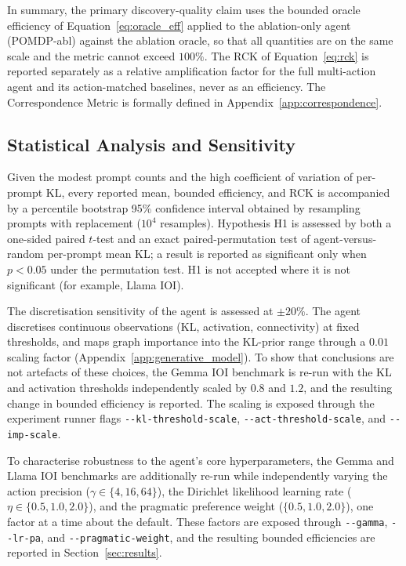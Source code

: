 In summary, the primary discovery-quality claim uses the bounded oracle
efficiency of Equation~\ref{eq:oracle_eff} applied to the ablation-only agent
(POMDP-abl) against the ablation oracle, so that all quantities are on the same
scale and the metric cannot exceed $100\%$. The RCK of Equation~\ref{eq:rck} is
reported separately as a relative amplification factor for the full
multi-action agent and its action-matched baselines, never as an efficiency.
The Correspondence Metric is formally defined in Appendix~\ref{app:correspondence}.

\subsection{Statistical Analysis and Sensitivity}
\label{sec:stats_protocol}

Given the modest prompt counts and the
high coefficient of variation of per-prompt KL, every reported mean,
bounded efficiency, and RCK is accompanied by a percentile bootstrap 95\% confidence
interval obtained by resampling prompts with replacement ($10^4$ resamples).
Hypothesis H1 is assessed by both a one-sided paired $t$-test and an exact
paired-permutation test of agent-versus-random per-prompt mean KL; a result is
reported as significant only when $p<0.05$ under the permutation test. H1 is not
accepted where it is not significant (for example, Llama IOI).

The discretisation sensitivity of the agent is assessed at $\pm 20\%$. The agent discretises
continuous observations (KL, activation, connectivity) at fixed thresholds, and maps
graph importance into the KL-prior range through a $0.01$ scaling factor
(Appendix~\ref{app:generative_model}). To show that conclusions are not artefacts of
these choices, the Gemma IOI benchmark is re-run with the KL and activation
thresholds independently scaled by $0.8$ and $1.2$, and the resulting change in
bounded efficiency is reported. The scaling is exposed through the experiment runner
flags \texttt{-{}-kl-threshold-scale}, \texttt{-{}-act-threshold-scale}, and
\texttt{-{}-imp-scale}.

To characterise robustness to the agent's
core hyperparameters, the Gemma and Llama IOI benchmarks are additionally re-run
while independently varying the action precision ($\gamma \in \{4, 16, 64\}$), the
Dirichlet likelihood learning rate ($\eta \in \{0.5, 1.0, 2.0\}$), and the pragmatic
preference weight ($\{0.5, 1.0, 2.0\}$), one factor at a time about the default.
These factors are exposed through \texttt{-{}-gamma}, \texttt{-{}-lr-pa}, and
\texttt{-{}-pragmatic-weight}, and the resulting bounded efficiencies are reported in
Section~\ref{sec:results}.

